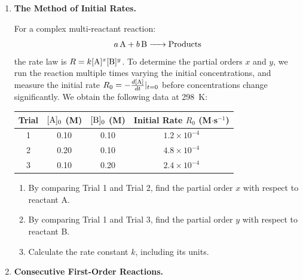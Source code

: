 \documentclass[12pt, a4paper]{book}
\begin{document}
\begin{deepbox}
\begin{enumerate}[label=\textbf{D\arabic*.}]
  \item \textbf{The Method of Initial Rates.}
  
        For a complex multi-reactant reaction:
        \[
          \ce{a A + b B -> Products}
        \]
        the rate law is $R = k[\ce{A}]^x[\ce{B}]^y$.
        To determine the partial orders $x$ and $y$, we run the reaction multiple times varying the initial concentrations, and measure the initial rate $R_0 = -\frac{d[\ce{A}]}{dt}|_{t=0}$ before concentrations change significantly.
        We obtain the following data at \SI{298}{K}:
        \begin{center}
        \begin{tabular}{cccc}
        \toprule
        \textbf{Trial} & \textbf{$[\ce{A}]_0$ (M)} & \textbf{$[\ce{B}]_0$ (M)} & \textbf{Initial Rate } $R_0$ (M$\cdot$s$^{-1}$) \\
        \midrule
        1 & 0.10 & 0.10 & $1.2 \times 10^{-4}$ \\
        2 & 0.20 & 0.10 & $4.8 \times 10^{-4}$ \\
        3 & 0.10 & 0.20 & $2.4 \times 10^{-4}$ \\
        \bottomrule
        \end{tabular}
        \end{center}
        \begin{enumerate}[label=(\alph*)]
          \item By comparing Trial 1 and Trial 2, find the partial order $x$ with respect to reactant A.
          \item By comparing Trial 1 and Trial 3, find the partial order $y$ with respect to reactant B.
          \item Calculate the rate constant $k$, including its units.
        \end{enumerate}

  \item \textbf{Consecutive First-Order Reactions.}
  

\end{enumerate}
\end{deepbox}
\end{document}
